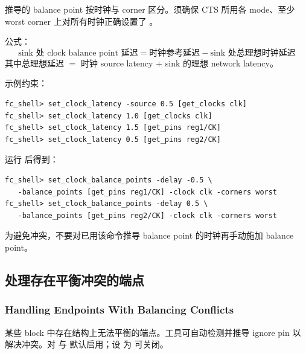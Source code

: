 推导的 balance point 按时钟与 corner 区分。须确保 CTS 所用各 mode、至少 worst corner 上对所有时钟正确设置了 。

公式：
\[
\text{sink 处 clock balance point 延迟} = \text{时钟参考延迟} - \text{sink 处总理想时钟延迟}
\]
其中总理想延迟 $=$ 时钟 source latency $+$ sink 的理想 network latency。

示例约束：
\begin{lstlisting}
fc_shell> set_clock_latency -source 0.5 [get_clocks clk]
fc_shell> set_clock_latency 1.0 [get_clocks clk]
fc_shell> set_clock_latency 1.5 [get_pins reg1/CK]
fc_shell> set_clock_latency 0.5 [get_pins reg2/CK]
\end{lstlisting}
运行  后得到：
\begin{lstlisting}
fc_shell> set_clock_balance_points -delay -0.5 \
   -balance_points [get_pins reg1/CK] -clock clk -corners worst
fc_shell> set_clock_balance_points -delay 0.5 \
   -balance_points [get_pins reg2/CK] -clock clk -corners worst
\end{lstlisting}
为避免冲突，不要对已用该命令推导 balance point 的时钟再手动施加 balance point。

\subsection{处理存在平衡冲突的端点}
\subsubsection*{Handling Endpoints With Balancing Conflicts}

某些 block 中存在结构上无法平衡的端点。工具可自动检测并推导 ignore pin 以解决冲突。对  与  默认启用；设  为  可关闭。

